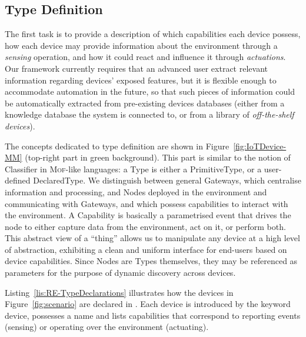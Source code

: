 \subsection{Type Definition}
\label{sec:IoTDSL-TD}

The first task is to provide a description of which capabilities each device possess, how each device may provide information about the environment through a \emph{sensing} operation, and how it could react and influence it through \emph{actuations}. Our framework currently requires that an advanced user extract  relevant information regarding devices' exposed features, but it is flexible enough to accommodate automation in the future, so that such pieces of information could be automatically extracted from pre-existing devices databases (either from a knowledge database the \IOT system is connected to, or from a library of \emph{off-the-shelf devices}).

The concepts dedicated to type definition are shown in Figure~\ref{fig:IoTDevice-MM} (top-right part in green background). This part is similar to the notion of \textsf{Classifier} in \textsc{Mof}-like languages: a \textsf{Type} is either a \textsf{PrimitiveType}, or a user-defined \textsf{DeclaredType}. We distinguish between general \textsf{Gateway}s, which centralise information and processing, and \textsf{Node}s deployed in the environment and communicating with \textsf{Gateway}s, and which possess capabilities to interact with the environment. A \textsf{Capability} is basically a parametrised event that drives the node to either capture data from the environment, act on it, or perform both. This abstract view of a ``thing'' allows us to manipulate any device at a high level of abstraction, exhibiting a clean and uniform interface for end-users based on device capabilities. Since \textsf{Node}s are \textsf{Type}s themselves, they may be referenced as parameters for the purpose of dynamic discovery across devices.

Listing~\ref{lis:RE-TypeDeclarations} illustrates how the devices in Figure~\ref{fig:scenario} are declared in \IOTDSL. Each device is introduced by the keyword \textsf{device}, possesses a name and lists capabilities that correspond to reporting events (\textsf{sensing}) or operating over the environment (\textsf{actuating}). 

